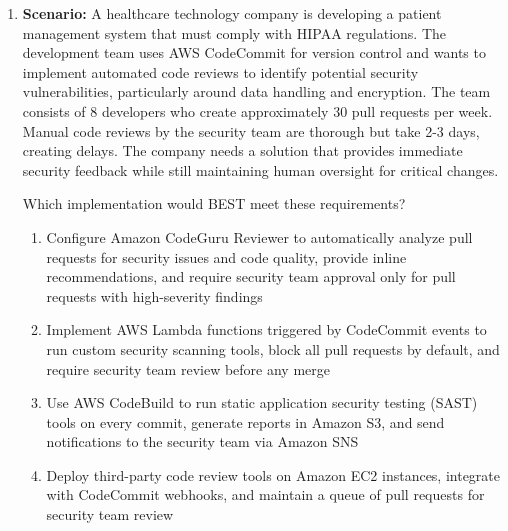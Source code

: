 \documentclass[12pt,a4paper]{article}
\begin{document}
\begin{enumerate}[label=\textbf{Q\arabic*.}]
How can you optimize the testing stage to reduce pipeline execution time while maintaining test reliability?

\begin{enumerate}[label=\Alph*.]
    \item Configure CodeBuild to use a larger compute instance type with more CPU and memory resources to speed up sequential test execution
    \item Modify the buildspec.yml to run tests for all 12 modules in parallel using CodeBuild batch builds, with each module tested in a separate build job
    \item Reduce the number of test cases by removing redundant tests and focusing only on critical path testing to decrease overall execution time
    \item Implement test result caching in CodeBuild so that unchanged modules skip testing, only running tests for modules with code changes
\end{enumerate}

\textit{Answer: B}

\item \textbf{Scenario:} A healthcare technology company is developing a patient management system that must comply with HIPAA regulations. The development team uses AWS CodeCommit for version control and wants to implement automated code reviews to identify potential security vulnerabilities, particularly around data handling and encryption. The team consists of 8 developers who create approximately 30 pull requests per week. Manual code reviews by the security team are thorough but take 2-3 days, creating delays. The company needs a solution that provides immediate security feedback while still maintaining human oversight for critical changes.

Which implementation would BEST meet these requirements?

\begin{enumerate}[label=\Alph*.]
    \item Configure Amazon CodeGuru Reviewer to automatically analyze pull requests for security issues and code quality, provide inline recommendations, and require security team approval only for pull requests with high-severity findings
    \item Implement AWS Lambda functions triggered by CodeCommit events to run custom security scanning tools, block all pull requests by default, and require security team review before any merge
    \item Use AWS CodeBuild to run static application security testing (SAST) tools on every commit, generate reports in Amazon S3, and send notifications to the security team via Amazon SNS
    \item Deploy third-party code review tools on Amazon EC2 instances, integrate with CodeCommit webhooks, and maintain a queue of pull requests for security team review
\end{enumerate}


\end{enumerate}
\end{document}
